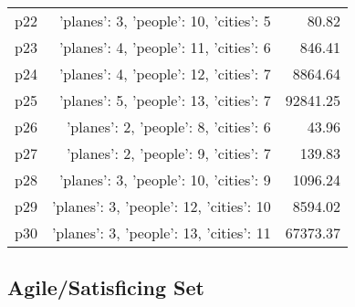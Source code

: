 \documentclass{article}
\begin{document}
\begin{center}
\begin{tabular}{@{}l|r|r@{}}
  p22&{'planes': 3, 'people': 10, 'cities': 5}&80.82\\
  p23&{'planes': 4, 'people': 11, 'cities': 6}&846.41\\
  p24&{'planes': 4, 'people': 12, 'cities': 7}&8864.64\\
  p25&{'planes': 5, 'people': 13, 'cities': 7}&92841.25\\
  p26&{'planes': 2, 'people': 8, 'cities': 6}&43.96\\
  p27&{'planes': 2, 'people': 9, 'cities': 7}&139.83\\
  p28&{'planes': 3, 'people': 10, 'cities': 9}&1096.24\\
  p29&{'planes': 3, 'people': 12, 'cities': 10}&8594.02\\
  p30&{'planes': 3, 'people': 13, 'cities': 11}&67373.37
                            \end{tabular}
                            \end{center}
                    

                                \subsection*{Agile/Satisficing Set}
                                
\end{document}
